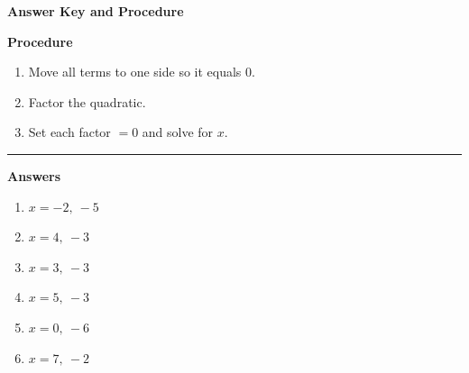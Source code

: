 \documentclass[12pt]{article}
\begin{document}
\begin{center}{\Large \textbf{Answer Key and Procedure}}\end{center}
\vspace{0.3cm}
\textbf{Procedure}
\begin{enumerate}
  \item Move all terms to one side so it equals $0$.
  \item Factor the quadratic.
  \item Set each factor $=0$ and solve for $x$.
\end{enumerate}
\vspace{0.4cm}\hrule\vspace{0.4cm}
\textbf{Answers}
\begin{enumerate}[label=\textbf{\arabic*.}]
  \item $x=-2,\ -5$
  \item $x=4,\ -3$
  \item $x=3,\ -3$
  \item $x=5,\ -3$
  \item $x=0,\ -6$
  \item $x=7,\ -2$
\end{enumerate}
\end{document}
